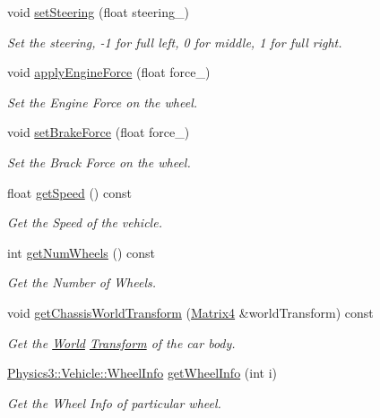 \begin{DoxyCompactItemize}
void \hyperlink{class_i_dream_sky_1_1_physics3_1_1_vehicle_a97244097d41efb8c5fd2d0ff27116856}{set\+Steering} (float steering\+\_\+)
\begin{DoxyCompactList}\small\item\em Set the steering, -\/1 for full left, 0 for middle, 1 for full right. \end{DoxyCompactList}\item 
void \hyperlink{class_i_dream_sky_1_1_physics3_1_1_vehicle_ae8eec22a56145b83639c3d1d474e273f}{apply\+Engine\+Force} (float force\+\_\+)
\begin{DoxyCompactList}\small\item\em Set the Engine Force on the wheel. \end{DoxyCompactList}\item 
void \hyperlink{class_i_dream_sky_1_1_physics3_1_1_vehicle_a79609b49d9128c0d6945de63adbdf611}{set\+Brake\+Force} (float force\+\_\+)
\begin{DoxyCompactList}\small\item\em Set the Brack Force on the wheel. \end{DoxyCompactList}\item 
float \hyperlink{class_i_dream_sky_1_1_physics3_1_1_vehicle_ad96a9aba6898189ecd50c12a0b2a907f}{get\+Speed} () const 
\begin{DoxyCompactList}\small\item\em Get the Speed of the vehicle. \end{DoxyCompactList}\item 
int \hyperlink{class_i_dream_sky_1_1_physics3_1_1_vehicle_abaf97b9040b289d7949558fcdaa02e54}{get\+Num\+Wheels} () const 
\begin{DoxyCompactList}\small\item\em Get the Number of Wheels. \end{DoxyCompactList}\item 
void \hyperlink{class_i_dream_sky_1_1_physics3_1_1_vehicle_ae5ee4c2f720649fabe64b4080b0b87f4}{get\+Chassis\+World\+Transform} (\hyperlink{class_i_dream_sky_1_1_matrix4}{Matrix4} \&world\+Transform) const 
\begin{DoxyCompactList}\small\item\em Get the \hyperlink{class_i_dream_sky_1_1_physics3_1_1_world}{World} \hyperlink{class_i_dream_sky_1_1_transform}{Transform} of the car body. \end{DoxyCompactList}\item 
\hyperlink{class_i_dream_sky_1_1_physics3_1_1_vehicle_1_1_wheel_info}{Physics3\+::\+Vehicle\+::\+Wheel\+Info} \hyperlink{class_i_dream_sky_1_1_physics3_1_1_vehicle_a9edd0dadc5b999e2719aaec1df69808d}{get\+Wheel\+Info} (int i)
\begin{DoxyCompactList}\small\item\em Get the Wheel Info of particular wheel. \end{DoxyCompactList}\end{DoxyCompactItemize}
